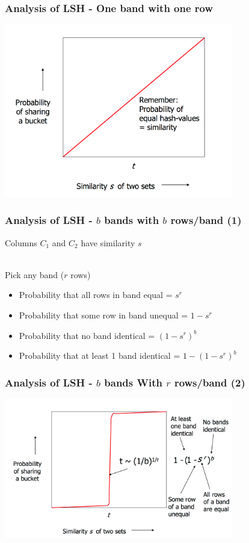 \documentclass[svgnames]{beamer}
\begin{document}
  
\begin{frame} \frametitle{Analysis of LSH - One band with one row}
\includegraphics[width=10cm]{what-1-band-gives}
\end{frame}

  
\begin{frame} \frametitle{Analysis of LSH - $b$ bands with $b$ rows/band (1)}

Columns $C_1$ and $C_2$ have similarity $s$

~\\

Pick any band ($r$ rows)

\begin{itemize}
  \item Probability that all rows in band equal = $s^r$
  \item Probability that some row in band unequal = $1 - s^r$
  \item Probability that no band identical = $(1 - s^r)^b$
  \item Probability that at least 1 band identical = $1 - (1 - s^r)^b$  
\end{itemize}
\end{frame}

  
\begin{frame} \frametitle{Analysis of LSH - $b$ bands With $r$ rows/band (2)}
\includegraphics[width=10cm]{what-b-bands-gives}
\end{frame}
\end{document}
